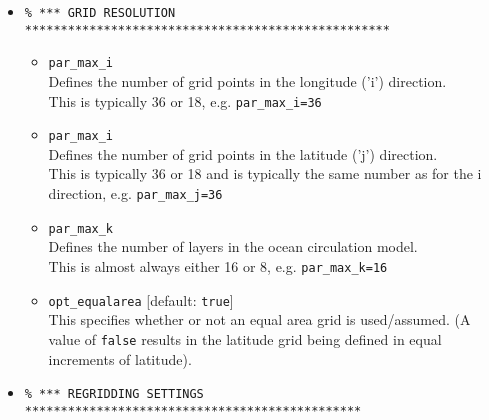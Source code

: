 \begin{itemize}
\vspace{2mm}
\item []
\small\vspace{-2pt}\begin{verbatim}
% *** GRID RESOLUTION ***************************************************
\end{verbatim}\vspace{-2pt}\normalsize

\begin{itemize}[noitemsep]

\vspace{1mm}
\item \texttt{par\_max\_i}
\vspace{1mm}
\\Defines the number of grid points in the longitude ('i') direction.
\\This is typically 36 or 18, e.g. \texttt{par\_max\_i=36}

\vspace{1mm}
\item \texttt{par\_max\_i}
\vspace{1mm}
\\Defines the number of grid points in the latitude ('j') direction.
\\This is typically 36 or 18 and is typically the same number as for the i direction, e.g. \texttt{par\_max\_j=36}

\vspace{1mm}
\item \texttt{par\_max\_k}
\vspace{1mm}
\\Defines the number of  layers in the ocean circulation model.
\\This is almost always either 16 or 8, e.g. \texttt{par\_max\_k=16}

\vspace{1mm}
\item \texttt{opt\_equalarea} [default: \texttt{true}]
\vspace{1mm}
\\This specifies whether or not an equal area grid is used/assumed. (A value of \texttt{false} results in the latitude grid being defined in equal increments of latitude).

\end{itemize}

\pagebreak

\vspace{2mm}
\item []
\small\vspace{-2pt}\begin{verbatim}
% *** REGRIDDING SETTINGS ***********************************************
\end{verbatim}\vspace{-2pt}\normalsize


\end{itemize}
